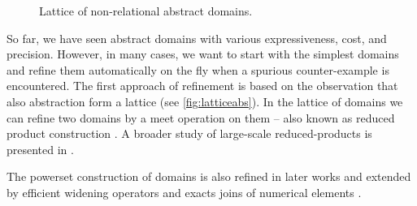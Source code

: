 \begin{figure}%
    \centering
    \caption{Lattice of non-relational abstract domains.}
    \label{fig:latticeabs}%
\end{figure}%

So far, we have seen abstract domains with various expressiveness, cost, and
precision. However, in many cases, we want to start with the simplest domains
and refine them automatically on the fly when a spurious counter-example is
encountered. The first approach of refinement is based on the observation that
also abstraction form a lattice (see \autoref{fig:latticeabs}). In the lattice
of domains we can refine two domains by a meet operation on them -- also known
as reduced product construction \cite{Toubhans2013, Cousot2011b}. A broader
study of large-scale reduced-products is presented in \cite{Cousot2007}.

The powerset construction of domains \cite{Cousot1979} is also refined in later works
\cite{File1999} and extended by efficient widening operators \cite{Bagnara2004}
and exacts joins of numerical elements \cite{Bagnara2010}.

